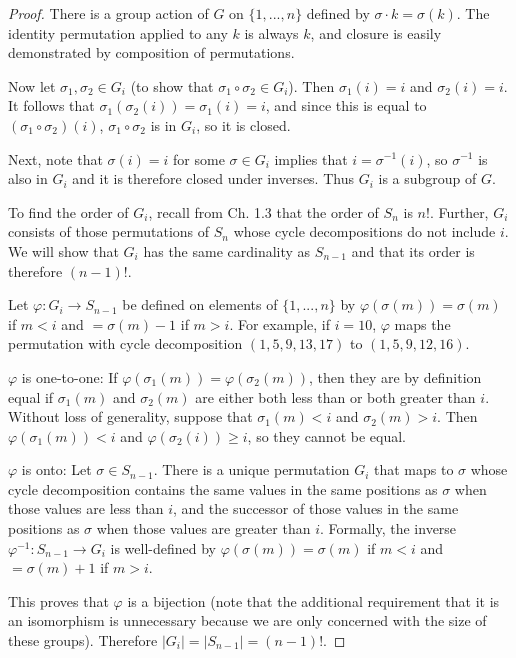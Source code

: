 \documentclass{article}
\begin{document}
\begin{proof}
    There is a group action of $G$ on $\{ 1, ..., n \}$ defined by $\sigma \cdot k = \sigma(k)$. The identity permutation applied to any $k$ is always $k$, and closure is easily demonstrated by composition of permutations.

    Now let $\sigma_1, \sigma_2 \in G_i$ (to show that $\sigma_1 \circ \sigma_2 \in G_i$). Then $\sigma_1(i) = i$ and $\sigma_2(i) = i$. It follows that $\sigma_1(\sigma_2(i)) = \sigma_1(i) = i$, and since this is equal to $(\sigma_1 \circ \sigma_2)(i)$, $\sigma_1 \circ \sigma_2$ is in $G_i$, so it is closed.

    Next, note that $\sigma(i) = i$ for some $\sigma \in G_i$ implies that $i = \sigma^{-1}(i)$, so $\sigma^{-1}$ is also in $G_i$ and it is therefore closed under inverses. Thus $G_i$ is a subgroup of $G$.

    To find the order of $G_i$, recall from Ch. 1.3 that the order of $S_n$ is $n!$. Further, $G_i$ consists of those permutations of $S_n$ whose cycle decompositions do not include $i$. We will show that $G_i$ has the same cardinality as $S_{n - 1}$ and that its order is therefore $(n - 1)!$.

    Let $\varphi: G_i \rightarrow S_{n - 1}$ be defined on elements of $\{ 1, ..., n \}$ by $\varphi(\sigma(m)) = \sigma(m)$  if $m < i$ and $= \sigma(m) - 1$ if $m > i$. For example, if $i = 10$, $\varphi$ maps the permutation with cycle decomposition $(1, 5, 9, 13, 17)$ to $(1, 5, 9, 12, 16)$.
    
    $\varphi$ is one-to-one: If $\varphi(\sigma_1(m)) = \varphi(\sigma_2(m))$, then they are by definition equal if $\sigma_1(m)$ and $\sigma_2(m)$ are either both less than or both greater than $i$. Without loss of generality, suppose that $\sigma_1(m) < i$ and $\sigma_2(m) > i$. Then $\varphi(\sigma_1(m)) < i$ and $\varphi(\sigma_2(i)) \geq i$, so they cannot be equal.

    $\varphi$ is onto: Let $\sigma \in S_{n - 1}$. There is a unique permutation $G_i$ that maps to $\sigma$ whose cycle decomposition contains the same values in the same positions as $\sigma$ when those values are less than $i$, and the successor of those values in the same positions as $\sigma$ when those values are greater than $i$. Formally, the inverse $\varphi^{-1}: S_{n - 1} \rightarrow G_i$ is well-defined by $\varphi(\sigma(m)) = \sigma(m)$ if $m < i$ and $= \sigma(m) + 1$ if $m > i$.

    This proves that $\varphi$ is a bijection (note that the additional requirement that it is an isomorphism is unnecessary because we are only concerned with the size of these groups). Therefore $|G_i| = |S_{n - 1}| = (n - 1)!$.
\end{proof}
\end{document}
